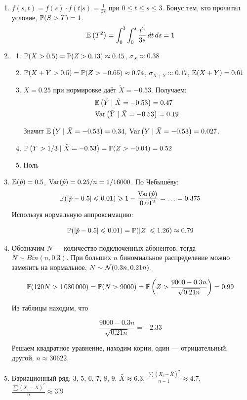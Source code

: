 \begin{enumerate}
\item  $f(s,t)=f(s)\cdot f(t|s)=\frac{1}{3s}$ при $0\leq t\leq s\leq 3$.
Бонус тем, кто прочитал условие, $\P(S>T)=1$.
\[
\E\left(T^2\right)=\int_0^3\int_0^s \frac{t^2}{3s}\,dt\,ds=1
\]
\item
\begin{enumerate}
\item $\P(X>0.5) = \P(Z > 0.13) \approx 0.45$, $\sigma_X \approx 0.38$
\item $\P(X+Y>0.5) =
\P(Z>-0.65)\approx 0.74$,
$\sigma_{X+Y} \approx 0.17$, $\E(X+Y) = 0.61$

\item $X = 0.25$ при нормировке даёт $\tilde{X} = -0.53$.
Получаем:
\begin{align*}
& \E\left(\tilde{Y} \mid \tilde{X} = -0.53\right) = 0.47 \\
& \Var\left(\tilde{Y} \mid \tilde{X} = -0.53\right) = 0.19
\end{align*}

Значит $\E\left(Y \mid \tilde{X} = -0.53\right) = 0.34$,
$\Var\left(Y \mid \tilde{X} = -0.53\right)=0.027$.

\item $\P\left(Y > 1/3 \mid \tilde{X} = -0.53\right) = \P(Z > -0.04) = 0.52$
\item Ноль
\end{enumerate}
\item $\E(\hat{p})=0.5$, $\Var(\hat{p})=0.25/n=1/16000$. По Чебышёву:
\[
\P(|\hat{p}-0.5|\leq 0.01)\geq 1-\frac{\Var(\hat{p})}{0.01^2}=\ldots=0.375
\]
Используя нормальную аппроксимацию:

\[
\P(|\hat{p}-0.5|\leq 0.01)=\P(|Z|\leq 1.26)\approx 0.79
\]
\item Обозначим $N$ — количество подключенных абонентов, тогда $N\sim Bin(n,0.3)$.
При больших $n$ биномиальное распределение можно заменить на нормальное,
$N\sim \cN(0.3n,0.21n)$.

\[
\P(120N>1\,080\,000)=\P(N>9000)=\P\left(Z>\frac{9000-0.3n}{\sqrt{0.21n}}\right)=0.99
\]

Из таблицы находим, что

\[
\frac{9000-0.3n}{\sqrt{0.21n}} = -2.33
\]

Решаем квадратное уравнение, находим корни, один — отрицательный, другой, $n\approx 30622$.
\item

Вариационный ряд: $3$, $5$, $6$, $7$, $8$, $9$. $\bar{X}\approx 6.3$,
$\frac{\sum (X_i-\bar{X})^2}{n-1}\approx 4.7$,
$\frac{\sum (X_i-\bar{X})^2}{n}\approx 3.9$



\end{enumerate}
